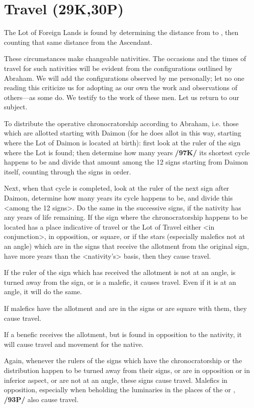 \section{Travel (29K,30P)}

The Lot of Foreign  Lands is found by determining the distance from \Saturn\xspace to \Mars, then counting that same distance from the Ascendant. 

These circumstances make changeable nativities. The occasions
and the times of travel for such nativities will be evident from the configurations outlined by Abraham. We will add the configurations observed by me personally; let no one reading this criticize us for adopting as our own the work and observations of others—as some do. We testify to the work of these men. Let us return to our subject.

To distribute the operative chronocratorship according to Abraham, i.e. those which are allotted starting with Daimon (for he does allot in this way, starting where the Lot of Daimon is located at birth): first look at the ruler of the sign where the Lot is found; then determine how many years \textbf{/97K/} its shortest cycle happens to be and divide that amount among the 12 signs starting from Daimon itself, counting through the signs in order. 

Next, when that cycle is completed, look at the ruler of the next sign after Daimon, determine how many years its cycle happens to be, and divide this <among the 12 signs>. Do
the same in the successive signs, if the nativity has any years of life remaining. If the sign where the chronocratorship happens to be located has a place indicative of travel or the Lot of Travel either <in conjunction>, in opposition, or square, or if the stars (especially malefics not at an angle) which are in the signs that receive the allotment from the original sign, have more years than the <nativity’s> basis, then they cause travel. 

If the ruler of the sign which has received the allotment is not at an angle, is turned away from the sign, or is a malefic, it causes travel. Even if it is at an angle, it will do the same. 

If malefics have the allotment and are in the signs or are square with them, they cause travel. 

If a benefic receives the allotment, but is found in opposition to the nativity, it will cause travel and movement for the native. 

Again, whenever the rulers of the signs which have the chronocratorship or the distribution happen to be turned
away from their signs, or are in opposition or in inferior aspect, or are not at an angle, these signs cause
travel. Malefics in opposition, especially when beholding the luminaries in the places of the \Sun\xspace or \Moon,
\textbf{/93P/} also cause travel. 

